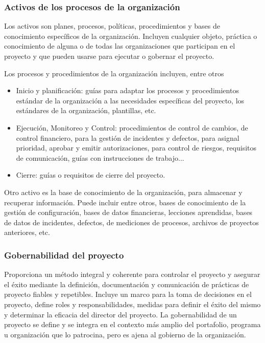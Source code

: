 \subsubsection{Activos de los procesos de la organización}

Los activos son planes, procesos, políticas, procedimientos y bases de conocimiento específicos de la organización. Incluyen cualquier objeto, práctica o conocimiento de alguna o de todas las organizaciones que participan en el proyecto y que pueden usarse para ejecutar o gobernar el proyecto.

Los procesos y procedimientos de la organización incluyen, entre otros
\begin{itemize}
\item{Inicio y planificación: guías para adaptar los procesos y procedimientos estándar de la organización a las necesidades específicas del proyecto, los estándares de la organización, plantillas, etc.}
\item{Ejecución, Monitoreo y Control: procedimientos de control de cambios, de control financiero, para la gestión de incidentes y defectos, para asignal prioridad, aprobar y emitir autorizaciones, para control de riesgos, requisitos de comunicación, guías con instrucciones de trabajo...}
\item{Cierre: guías o requisitos de cierre del proyecto.}
\end{itemize}

Otro activo es la base de conocimiento de la organización, para almacenar y recuperar información. Puede incluir entre otros, bases de conocimiento de la gestión de configuración, bases de datos financieras, lecciones aprendidas, bases de datos de incidentes, defectos, de mediciones de procesos, archivos de proyectos anteriores, etc.

\subsubsection{Gobernabilidad del proyecto}

Proporciona un método integral y coherente para controlar el proyecto y  asegurar  el  éxito  mediante  la  definición,  documentación  y  comunicación  de  prácticas  de  proyecto  fiables  y  repetibles.  Incluye  un  marco  para  la  toma  de  decisiones  en  el  proyecto,  define  roles  y  responsabilidades,  medidas para definir el éxito del mismo y determinar la eficacia del director del proyecto. La gobernabilidad 
de un proyecto se define y se integra en el contexto más amplio del portafolio, programa u organización que lo patrocina, pero es ajena al gobierno de la organización.

